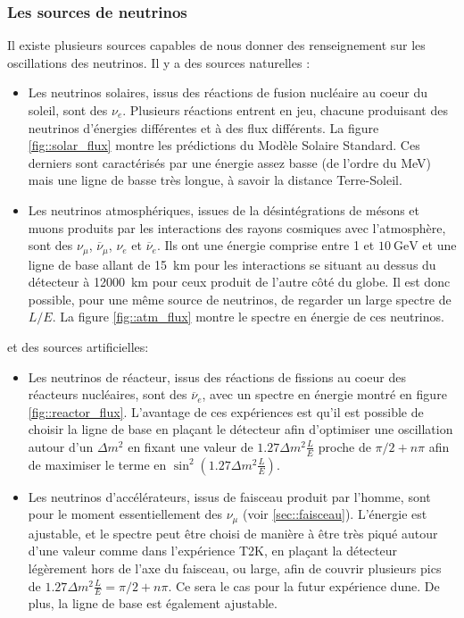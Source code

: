             \subsubsection{Les sources de neutrinos}
                Il existe plusieurs sources capables de nous donner des renseignement sur les oscillations des neutrinos. Il y a des sources naturelles :
                \begin{itemize}
                    \item Les neutrinos solaires, issus des réactions de fusion nucléaire au coeur du soleil, sont des $\nu_e$. Plusieurs réactions entrent en jeu, chacune produisant des neutrinos d'énergies différentes et à des flux différents. La figure \autoref{fig::solar_flux} montre les prédictions du Modèle Solaire Standard\cite{Haxton2013}. Ces derniers sont caractérisés par une énergie assez basse (de l'ordre du \si{\mega\electronvolt}) mais une ligne de basse très longue, à savoir la distance Terre-Soleil.
                    \item Les neutrinos atmosphériques, issues de la désintégrations de mésons et muons produits par les interactions des rayons cosmiques avec l'atmosphère, sont des $\nu_{\mu}$, $\overline{\nu}_{\mu}$, $\nu_e$ et $\overline{\nu}_e$. Ils ont une énergie comprise entre 1 et $\SI{10}{\giga\electronvolt}$ et une ligne de base allant de \SI{15}{\kilo\meter} pour les interactions se situant au dessus du détecteur à \SI{12000}{\kilo\meter} pour ceux produit de l'autre côté du globe. Il est donc possible, pour une même source de neutrinos, de regarder un large spectre de $L/E$. La figure \autoref{fig::atm_flux} montre le spectre en énergie de ces neutrinos.
                \end{itemize}
                et des sources artificielles:
                \begin{itemize}
                    \item Les neutrinos de réacteur, issus des réactions de fissions au coeur des réacteurs nucléaires, sont des $\overline{\nu}_e$, avec un spectre en énergie montré en figure \autoref{fig::reactor_flux}. L'avantage de ces expériences est qu'il est possible de choisir la ligne de base en plaçant le détecteur afin d'optimiser une oscillation autour d'un $\Delta m^2$ en fixant une valeur de $1.27\Delta m^2\frac{L}{E}$ proche de $\pi/2+n\pi$ afin de maximiser le terme en $\sin^2(1.27\Delta m^2\frac{L}{E})$.
                    \item Les neutrinos d'accélérateurs, issus de faisceau produit par l'homme, sont pour le moment essentiellement des $\nu_{\mu}$ (voir \autoref{sec::faisceau}). L'énergie est ajustable, et le spectre peut être choisi de manière à être très piqué autour d'une valeur comme dans l'expérience T2K, en plaçant la détecteur légèrement hors de l'axe du faisceau\cite{McDonald2001}, ou large, afin de couvrir plusieurs pics de $1.27\Delta m^2\frac{L}{E}=\pi/2+n\pi$. Ce sera le cas pour la futur expérience \gls{dune}. De plus, la ligne de base est également ajustable.
                \end{itemize}
            
